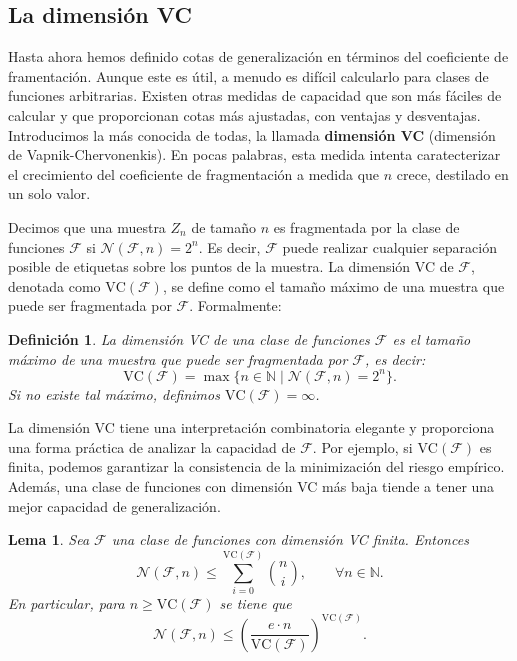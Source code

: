 \documentclass{report}
\newtheorem{lem}{Lema}[section]
\newtheorem{dfn}{Definición}[section]
\begin{document}
\subsection{La dimensión VC}

Hasta ahora hemos definido cotas de generalización en términos del coeficiente de framentación.
Aunque este es útil, a menudo es difícil calcularlo para clases de funciones arbitrarias. Existen otras medidas de capacidad
que son más fáciles de calcular y que proporcionan cotas más ajustadas, con ventajas y desventajas.
Introducimos la más conocida de todas, la llamada \textbf{dimensión VC} (dimensión de Vapnik-Chervonenkis). En pocas palabras,
esta medida intenta caratecterizar el crecimiento del coeficiente de fragmentación a medida que $n$ crece, destilado en un 
solo valor.\newline

Decimos que una muestra \(Z_n\) de tamaño \(n\) es fragmentada por la clase de funciones 
\(\mathcal{F}\) si \(\mathcal{N}(\mathcal{F}, n) = 2^n\). Es decir, \(\mathcal{F}\) puede realizar cualquier separación posible de etiquetas sobre 
los puntos de la muestra. La dimensión VC de \(\mathcal{F}\), denotada como \(\text{VC}(\mathcal{F})\), se define como el tamaño 
máximo de una muestra que puede ser fragmentada por \(\mathcal{F}\). Formalmente:\newline

\begin{dfn}
La dimensión VC de una clase de funciones \(\mathcal{F}\) es el tamaño máximo de una muestra que puede ser fragmentada por \(\mathcal{F}\), es decir:
\[
\text{VC}(\mathcal{F}) = \max \{n \in \mathbb{N} \mid \mathcal{N}(\mathcal{F}, n) = 2^n\}. 
\]
Si no existe tal máximo, definimos \(\text{VC}(\mathcal{F}) = \infty\).\newline
\end{dfn}

La dimensión VC tiene una interpretación combinatoria 
elegante y proporciona una forma práctica de analizar la capacidad de \(\mathcal{F}\). Por ejemplo, si \(\text{VC}(\mathcal{F})\) 
es finita, podemos garantizar la consistencia de la minimización del riesgo empírico. Además, una clase de funciones 
con dimensión VC más baja tiende a tener una mejor capacidad de generalización.\newline

\begin{lem}\label{def:cota combinatoria de dimensión VC}
    Sea $\mathcal{F}$ una clase de funciones con dimensión VC finita. Entonces
    \[
    \mathcal{N}(\mathcal{F}, n) \leq \sum_{i=0}^{\text{VC}(\mathcal{F})} \binom{n}{i} , \qquad \forall n \in \mathbb{N}.
    \]
    En particular, para $n\geq \text{VC}(\mathcal{F})$ se tiene que 
    \[
    \mathcal{N}(\mathcal{F}, n) \leq \left(\frac{e\cdot n}{\text{VC}(\mathcal{F})}\right)^{\text{VC}(\mathcal{F})}.
    \]
\end{lem}
\end{document}
